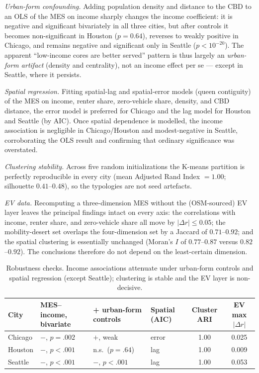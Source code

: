 \documentclass[11pt]{article}
\begin{document}
\emph{Urban-form confounding.} Adding population density and distance to the CBD
to an OLS of the MES on income sharply changes the income coefficient: it is
negative and significant bivariately in all three cities, but after controls it
becomes non-significant in Houston ($p=0.64$), reverses to weakly positive in
Chicago, and remains negative and significant only in Seattle ($p<10^{-20}$).
The apparent ``low-income cores are better served'' pattern is thus largely an
\emph{urban-form artifact} (density and centrality), not an income effect per se
--- except in Seattle, where it persists.

\emph{Spatial regression.} Fitting spatial-lag and spatial-error models (queen
contiguity) of the MES on income, renter share, zero-vehicle share, density, and
CBD distance, the error model is preferred for Chicago and the lag model for
Houston and Seattle (by AIC). Once spatial dependence is modelled, the income
association is negligible in Chicago/Houston and modest-negative in Seattle,
corroborating the OLS result and confirming that ordinary significance was
overstated.

\emph{Clustering stability.} Across five random initializations the K-means
partition is perfectly reproducible in every city (mean Adjusted Rand
Index $=1.00$; silhouette $0.41$--$0.48$), so the typologies are not seed
artefacts.

\emph{EV data.} Recomputing a three-dimension MES without the (OSM-sourced) EV
layer leaves the principal findings intact on every axis: the correlations with
income, renter share, and zero-vehicle share all move by $|\Delta r|\leq 0.05$;
the mobility-desert set overlaps the four-dimension set by a Jaccard of
$0.71$--$0.92$; and the spatial clustering is essentially unchanged (Moran's $I$
of $0.77$--$0.87$ versus $0.82$--$0.92$). The conclusions therefore do not depend
on the least-certain dimension.

\begin{table}[htbp]
\centering
\caption{Robustness checks. Income associations attenuate under urban-form
controls and spatial regression (except Seattle); clustering is stable and the
EV layer is non-decisive.}
\label{tab:robust}
\small
\begin{tabularx}{\textwidth}{l Y Y l c c}
\toprule
\textbf{City} & \textbf{MES--income, bivariate} & \textbf{+ urban-form controls} & \textbf{Spatial (AIC)} & \textbf{Cluster ARI} & \textbf{EV max $|\Delta r|$} \\
\midrule
Chicago & $-$, $p{=}.002$ & $+$, weak & error & 1.00 & 0.025 \\
Houston & $-$, $p{<}.001$ & n.s.\ ($p{=}.64$) & lag & 1.00 & 0.009 \\
Seattle & $-$, $p{<}.001$ & $-$, $p{<}.001$ & lag & 1.00 & 0.053 \\
\bottomrule
\end{tabularx}
\end{table}
\end{document}
